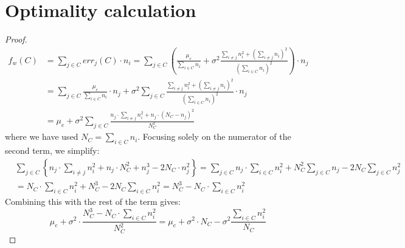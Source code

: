 \documentclass{article}
\newcommand{\p}[1]{\left( #1 \right)}
\newcommand{\cb}[1]{\left\{ #1 \right\}}
\newcommand{\cd}[0]{\cdot}
\newcommand{\mue}[0]{\ensuremath{\mu_e}}
\newcommand{\var}[0]{\ensuremath{\sigma^2}}
\newcommand{\ndraw}[0]{\ensuremath{n}}
\newcommand{\total}[0]{\ensuremath{N}}
\newcommand{\col}[0]{\ensuremath{C}}
\newcommand{\costw}[0]{\ensuremath{f_w}}
\begin{document}
\section{Optimality calculation}\label{app:opt}

\optdef*

\begin{proof}
\begin{align*}
\costw(\col) &= \sum_{j\in \col}err_j(\col) \cd \ndraw_i = \sum_{j\in \col}\p{\frac{\mue}{\sum_{i \in \col}\ndraw_i}+ \var \frac{\sum_{i\ne j}\ndraw_i^2 + \p{\sum_{i\ne j}\ndraw_i}^2}{\p{\sum_{i\in \col}\ndraw_i}^2}}\cd \ndraw_j\\
&= \sum_{j\in \col}\frac{\mue}{\sum_{i\in\col}\ndraw_i} \cd \ndraw_j + \var \sum_{j\in \col} \frac{\sum_{i\ne j}\ndraw_i^2 + \p{\sum_{i\ne j}\ndraw_i}^2}{\p{\sum_{i\in \col}\ndraw_i}^2}\cd \ndraw_j\\
&= \mue  + \var \sum_{j \in \col}\frac{\ndraw_j \cd \sum_{i \ne j}\ndraw_i^2 + \ndraw_j \cd (\total_{\col} - \ndraw_j)^2}{\total_{\col}^2}
\end{align*}
where we have used $\total_{\col} = \sum_{i \in \col}\ndraw_i$. Focusing solely on the numerator of the second term, we simplify:
\begin{align*}
&\sum_{j\in \col}\cb{\ndraw_j \cd \sum_{i\ne j} \ndraw_i^2 + \ndraw_j \cd \total_{\col}^2 + \ndraw_j^3 - 2 \total_{\col} \cd \ndraw_j^2} = \sum_{j \in \col} \ndraw_j \cd \sum_{i\in \col} \ndraw_i^2 + \total_{\col}^2\sum_{j \in \col}\ndraw_j -2 \total_{\col} \sum_{j \in \col} \ndraw_j^2\\
&=\total_{\col} \cd \sum_{i \in \col}\ndraw_i^2 + \total_{\col}^3 - 2 \total_{\col} \sum_{i \in \col}\ndraw_i^2=\total_{\col}^3 - \total_{\col} \cd \sum_{i \in \col}\ndraw_i^2
\end{align*}
Combining this with the rest of the term gives: 
$$\mue + \var \cd \frac{\total_{\col}^3 - \total_{\col} \cd \sum_{i \in \col} \ndraw_i^2}{\total_{\col}^2} =  \mue + \var \cd \total_{\col} - \var \frac{\sum_{i \in \col} \ndraw_i^2}{\total_{\col}}$$
\end{proof}
\end{document}
